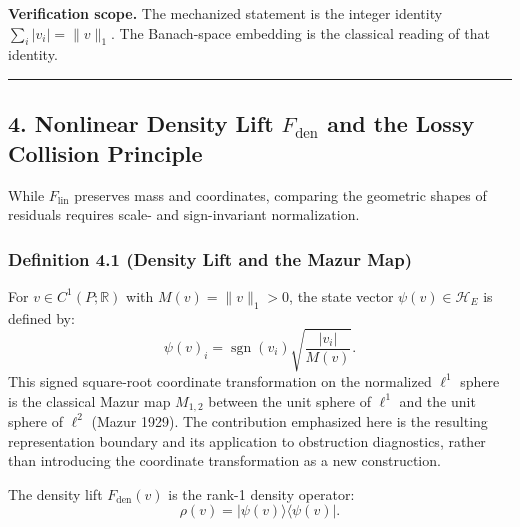 \documentclass[
  10pt,
]{article}
\begin{document}
\textbf{Verification scope.} The mechanized statement is the integer identity \protect\hypertarget{math-E0054-0057}{}{\(\sum_i |v_i| = \|v\|_1\)}. The Banach-space embedding is the classical reading of that identity.

\begin{center}\rule{0.5\linewidth}{0.5pt}\end{center}

\subsection[4. Nonlinear Density Lift and the Lossy Collision Principle]{\texorpdfstring{4. Nonlinear Density Lift \protect\hypertarget{math-E0003-0058}{}{\(F_{\mathrm{den}}\)} and the Lossy Collision Principle}{4. Nonlinear Density Lift F\_\{\textbackslash mathrm\{den\}\} and the Lossy Collision Principle}}\label{nonlinear-density-lift-f_mathrmden-and-the-lossy-collision-principle}

While \protect\hypertarget{math-E0004-0059}{}{\(F_{\mathrm{lin}}\)} preserves mass and coordinates, comparing the geometric shapes of residuals requires scale- and sign-invariant normalization.

\subsubsection{Definition 4.1 (Density Lift and the Mazur Map)}\label{definition-4.1-density-lift-and-the-mazur-map}

For \protect\hypertarget{math-E0018-0060}{}{\(v \in C^1(P; \mathbb{R})\)} with \protect\hypertarget{math-E0055-0061}{}{\(M(v) = \|v\|_1 > 0\)}, the state vector \protect\hypertarget{math-E0056-0062}{}{\(\psi(v) \in \mathcal{H}_E\)} is defined by: \protect\hypertarget{math-E0057-0063}{}{\[\psi(v)_i = \operatorname{sgn}(v_i) \sqrt{\frac{|v_i|}{M(v)}}.\]} This signed square-root coordinate transformation on the normalized \protect\hypertarget{math-E0001-0064}{}{\(\ell^1\)} sphere is the classical Mazur map \protect\hypertarget{math-E0009-0065}{}{\(M_{1,2}\)} between the unit sphere of \protect\hypertarget{math-E0001-0066}{}{\(\ell^1\)} and the unit sphere of \protect\hypertarget{math-E0058-0067}{}{\(\ell^2\)} (Mazur 1929). The contribution emphasized here is the resulting representation boundary and its application to obstruction diagnostics, rather than introducing the coordinate transformation as a new construction.

The density lift \protect\hypertarget{math-E0059-0068}{}{\(F_{\mathrm{den}}(v)\)} is the rank-1 density operator: \protect\hypertarget{math-E0060-0069}{}{\[\rho(v) = |\psi(v)\rangle \langle \psi(v)|.\]}
\end{document}
